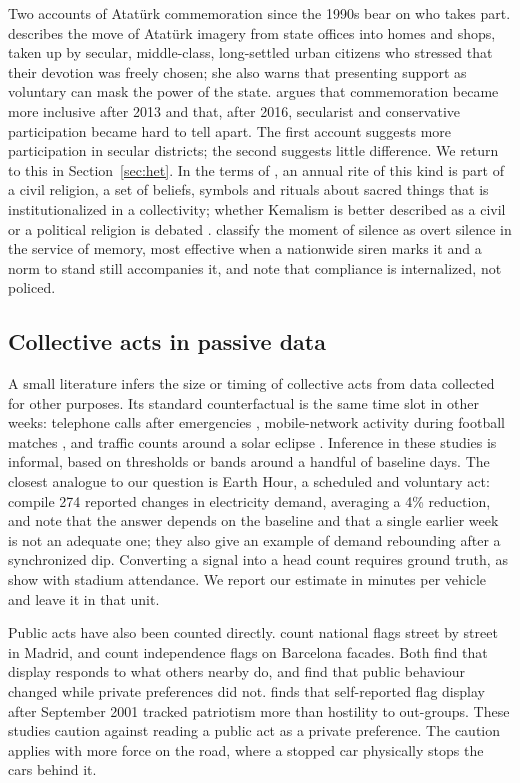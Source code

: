 \documentclass[11pt,a4paper]{article}
\begin{document}
Two accounts of Atatürk commemoration since the 1990s bear on who takes part. \citet{ozyurek2004}
describes the move of Atatürk imagery from state offices into homes and shops, taken up by secular,
middle-class, long-settled urban citizens who stressed that their devotion was freely chosen; she
also warns that presenting support as voluntary can mask the power of the state. \citet{goldman2018}
argues that commemoration became more inclusive after 2013 and that, after 2016, secularist and
conservative participation became hard to tell apart. The first account suggests more participation
in secular districts; the second suggests little difference. We return to this in
Section~\ref{sec:het}. In the terms of \citet{bellah1967}, an annual rite of this kind is part of a
civil religion, a set of beliefs, symbols and rituals about sacred things that is institutionalized
in a collectivity; whether Kemalism is better described as a civil or a political religion is
debated \citep{karakus2023}. \citet{vinitzky2010} classify the moment of silence as overt silence
in the service of memory, most effective when a nationwide siren marks it and a norm to stand still
accompanies it, and note that compliance is internalized, not policed.

\subsection{Collective acts in passive data}

A small literature infers the size or timing of collective acts from data collected for other
purposes. Its standard counterfactual is the same time slot in other weeks: telephone calls after
emergencies \citep{bagrow2011}, mobile-network activity during football matches \citep{pinter2021},
and traffic counts around a solar eclipse \citep{ngeni2022}. Inference in these studies is informal,
based on thresholds or bands around a handful of baseline days. The closest analogue to our
question is Earth Hour, a scheduled and voluntary act: \citet{meier2014} compile 274 reported changes
in electricity demand, averaging a 4\% reduction, and note that the answer depends on the baseline
and that a single earlier week is not an adequate one; they also give an example of demand
rebounding after a synchronized dip.
Converting a signal into a head count requires ground truth, as \citet{botta2015} show with stadium
attendance. We report our estimate in minutes per vehicle and leave it in that unit.

Public acts have also been counted directly. \citet{dinas2024} count national flags street by
street in Madrid, and \citet{parravano2015} count independence flags on Barcelona facades. Both find
that display responds to what others nearby do, and \citet{dinas2024} find that public behaviour
changed while private preferences did not. \citet{skitka2005} finds that self-reported flag display
after September 2001 tracked patriotism more than hostility to out-groups. These studies caution
against reading a public act as a private preference. The caution applies with more force on the
road, where a stopped car physically stops the cars behind it.
\end{document}
